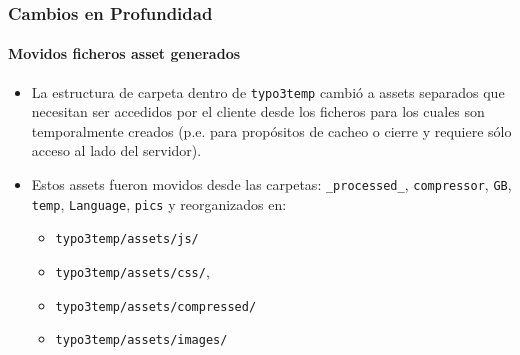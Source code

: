\begin{frame}[fragile]
	\frametitle{Cambios en Profundidad}
	\framesubtitle{Movidos ficheros asset generados}

	\lstset{basicstyle=\tiny\ttfamily}

	\begin{itemize}

		\item La estructura de carpeta dentro de \texttt{typo3temp} cambió a assets separados
			que necesitan ser accedidos por el cliente desde los ficheros para los cuales son temporalmente
			creados (p.e. para propósitos de cacheo o cierre y requiere sólo acceso
			al lado del servidor).

		\item Estos assets fueron movidos desde las carpetas:\newline
			\texttt{\_processed\_}, \texttt{compressor}, \texttt{GB}, \texttt{temp},
			\texttt{Language}, \texttt{pics}\newline
			y reorganizados en:

			\begin{itemize}
				\item \texttt{typo3temp/assets/js/}
				\item \texttt{typo3temp/assets/css/},
				\item \texttt{typo3temp/assets/compressed/}
				\item \texttt{typo3temp/assets/images/}
			\end{itemize}

	\end{itemize}

\end{frame}

